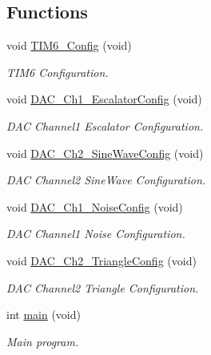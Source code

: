 \subsection*{Functions}
\begin{DoxyCompactItemize}
\item 
void \hyperlink{group___d_a_c___signals_generation_gac4b6c74684874d91f2fe01060d9f754c}{T\-I\-M6\-\_\-\-Config} (void)
\begin{DoxyCompactList}\small\item\em T\-I\-M6 Configuration. \end{DoxyCompactList}\item 
void \hyperlink{group___d_a_c___signals_generation_gafdab62b76aa186f5f49e12f55980c689}{D\-A\-C\-\_\-\-Ch1\-\_\-\-Escalator\-Config} (void)
\begin{DoxyCompactList}\small\item\em D\-A\-C Channel1 Escalator Configuration. \end{DoxyCompactList}\item 
void \hyperlink{group___d_a_c___signals_generation_gac2562f9db51d2de8da2b06c0dbf6c6c1}{D\-A\-C\-\_\-\-Ch2\-\_\-\-Sine\-Wave\-Config} (void)
\begin{DoxyCompactList}\small\item\em D\-A\-C Channel2 Sine\-Wave Configuration. \end{DoxyCompactList}\item 
void \hyperlink{group___d_a_c___signals_generation_ga7d21a37a44d4ff8546bf2931069c2f28}{D\-A\-C\-\_\-\-Ch1\-\_\-\-Noise\-Config} (void)
\begin{DoxyCompactList}\small\item\em D\-A\-C Channel1 Noise Configuration. \end{DoxyCompactList}\item 
void \hyperlink{group___d_a_c___signals_generation_gabe35ea8c85556116e9373eb6d1fe8c66}{D\-A\-C\-\_\-\-Ch2\-\_\-\-Triangle\-Config} (void)
\begin{DoxyCompactList}\small\item\em D\-A\-C Channel2 Triangle Configuration. \end{DoxyCompactList}\item 
int \hyperlink{group___d_a_c___signals_generation_ga840291bc02cba5474a4cb46a9b9566fe}{main} (void)
\begin{DoxyCompactList}\small\item\em Main program. \end{DoxyCompactList}\item 

\end{DoxyCompactItemize}

